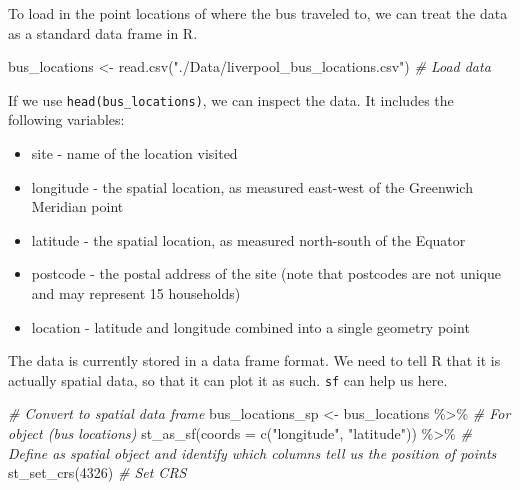 \documentclass[
]{book}
\newenvironment{Shaded}{\begin{snugshade}}{\end{snugshade}}
\newcommand{\AttributeTok}[1]{\textcolor[rgb]{0.77,0.63,0.00}{#1}}
\newcommand{\CommentTok}[1]{\textcolor[rgb]{0.56,0.35,0.01}{\textit{#1}}}
\newcommand{\DecValTok}[1]{\textcolor[rgb]{0.00,0.00,0.81}{#1}}
\newcommand{\FunctionTok}[1]{\textcolor[rgb]{0.00,0.00,0.00}{#1}}
\newcommand{\NormalTok}[1]{#1}
\newcommand{\OtherTok}[1]{\textcolor[rgb]{0.56,0.35,0.01}{#1}}
\newcommand{\SpecialCharTok}[1]{\textcolor[rgb]{0.00,0.00,0.00}{#1}}
\newcommand{\StringTok}[1]{\textcolor[rgb]{0.31,0.60,0.02}{#1}}
\providecommand{\tightlist}{%
  \setlength{\itemsep}{0pt}\setlength{\parskip}{0pt}}
\begin{document}
To load in the point locations of where the bus traveled to, we can treat the data as a standard data frame in R.

\begin{Shaded}
\begin{Highlighting}[]
\NormalTok{bus\_locations }\OtherTok{\textless{}{-}} \FunctionTok{read.csv}\NormalTok{(}\StringTok{"./Data/liverpool\_bus\_locations.csv"}\NormalTok{) }\CommentTok{\# Load data}
\end{Highlighting}
\end{Shaded}

If we use \texttt{head(bus\_locations)}, we can inspect the data. It includes the following variables:

\begin{itemize}
\tightlist
\item
  site - name of the location visited
\item
  longitude - the spatial location, as measured east-west of the Greenwich Meridian point
\item
  latitude - the spatial location, as measured north-south of the Equator
\item
  postcode - the postal address of the site (note that postcodes are not unique and may represent 15 households)
\item
  location - latitude and longitude combined into a single geometry point
\end{itemize}

The data is currently stored in a data frame format. We need to tell R that it is actually spatial data, so that it can plot it as such. \texttt{sf} can help us here.

\begin{Shaded}
\begin{Highlighting}[]
\CommentTok{\# Convert to spatial data frame}
\NormalTok{bus\_locations\_sp }\OtherTok{\textless{}{-}}\NormalTok{ bus\_locations }\SpecialCharTok{\%\textgreater{}\%} \CommentTok{\# For object (bus locations)}
  \FunctionTok{st\_as\_sf}\NormalTok{(}\AttributeTok{coords =} \FunctionTok{c}\NormalTok{(}\StringTok{"longitude"}\NormalTok{, }\StringTok{"latitude"}\NormalTok{)) }\SpecialCharTok{\%\textgreater{}\%} \CommentTok{\# Define as spatial object and identify which columns tell us the position of points}
  \FunctionTok{st\_set\_crs}\NormalTok{(}\DecValTok{4326}\NormalTok{) }\CommentTok{\# Set CRS}
\end{Highlighting}
\end{Shaded}
\end{document}
